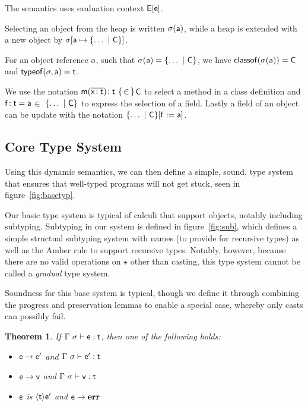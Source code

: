\documentclass[preprint]{sigplanconf}
\newcommand{\m}{\M{\xt{m}}}
\newcommand{\e}{\M{\xt{e}}}
\newcommand{\f}{\M{\xt{f}}}
\newcommand{\x}{\M{\xt{x}}}
\renewcommand{\t}{\M{\xt{t}}}
\newcommand{\C}{\M{\xt{C}}}
\newcommand{\err}{\M{\bt{err}}}
\newcommand{\s}{\M{\sigma}}
\renewcommand{\a}{\M{\xt a}}
\newcommand{\Cast}[2]{\M{\langle{#1}\rangle{#2}}}
\newcommand{\any}{\M{\star}}
\newcommand{\HT}[2]{\M{{#1}\!:{#2}}}
\newcommand{\Mdef}[5]{\M{ \HT { #1( \b{\HT{#2}{#3}})}{#4}~ \{\, {#5} \,\} }}
\newcommand{\Fdef}[3]{\M{ \HT{#1}{#2}={#3} }}
\newcommand{\is}{\M{\mapsto}}
\newcommand{\Obj}[2]{ \M{\{ #1 \B {#2}\}}}
\newcommand{\Heap}[2]{\M{ #1[ #2 ] }}
\newcommand{\B}{\M{~|~}}
\newcommand{\M}[1]{\ensuremath{#1}\xspace}
\newcommand{\xt}[1]{{\sf{#1}}\xspace}
\newcommand{\bt}[1]{\xt{\bf #1}}
\renewcommand{\b}[1]{\M{\overline{#1}}}
\newcommand{\inc}{\M{\in}}
\newcommand{\Update}[3]{\M{#1[ #2 := #3]}}
\newcommand{\Bind}[2]{\M{#1 \is #2}}
\newcommand{\classofis}[2]{\M{\xt{classof}(#1)=#2}}
\newcommand{\typeofis}[3]{\M{\xt{typeof}(#1,#2)=#3}}
\newcommand{\Sel}[2]{\M{#1(#2)}}
\newcommand{\EnvType}[3]{ \M{#1 \vdash #2 : #3}}
\newcommand{\E}{\M{\Gamma}}
\newcommand{\Es}{\E ~\s}
\newcommand{\Ctx}[1]{\M{\xt{E}[#1]}}
\newtheorem{thm}{Theorem}
\begin{document}
The semantics uses evaluation context \Ctx\e.

Selecting an object from the heap is written \Sel\s\a, while a heap is
extended with a new object by \Heap{\s}{\Bind{\a}{\Obj{\dots}\C}}.


For an object reference \a, such that \M{\Sel\s\a=\Obj{\dots}\C}, we have 
\classofis{\Sel\s\a}\C and \typeofis\s\a\t.

We use the notation \Mdef\m\x\t\t \inc\C to select a method in a class
definition and \Fdef\f\t\a\inc\Obj{\dots}\C to express the selection of a
field. Lastly a field of an object can be update with the notation
\Update{\Obj{\dots}\C}\f\a.

\subsection{Core Type System}

Using this dynamic semantics, we can then define a simple, sound, type system
that ensures that well-typed programs will not get stuck, seen in figure~\ref{fig:basetyp}.

Our basic type system is typical of calculi that support objects, notably including 
subtyping. Subtyping in our system is defined in figure~\ref{fig:sub}, which
defines a simple structual subtyping system with names (to provide for recursive types)
as well as the Amber rule to support recursive types. Notably, however, because there
are no valid operations on $\any$ other than casting, this type system cannot be called
a \emph{gradual} type system.


Soundness for this base system is typical, though we define it through combining 
the progress and preservation lemmas to enable a special case, whereby only casts
can possibly fail.

\begin{thm}
If $\EnvType\Es\e\t$, then one of the following holds:
\begin{itemize}
\item $\e \rightarrow \e'$ and $\EnvType\Es{\e'}\t$
\item $\e \rightarrow \xt{v}$ and $\EnvType\Es{\xt{v}}\t$
\item $\e$ is $\Cast{\t}{\e'}$ and $\e \rightarrow \err$
\end{itemize}
\end{thm}
\end{document}
